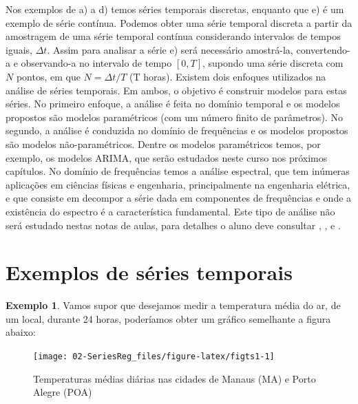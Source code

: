 \documentclass[
]{book}
\theoremstyle{definition}
\theoremstyle{definition}
\newtheorem{example}{Exemplo}[chapter]
\theoremstyle{definition}
\theoremstyle{remark}
\begin{document}
Nos exemplos de a) a d) temos séries temporais discretas, enquanto que e) é um exemplo de série contínua. Podemos obter uma série temporal discreta a partir da amostragem de uma série temporal contínua considerando intervalos de tempos iguais, \(\Delta t\). Assim para analisar a série e) será necessário amostrá-la, convertendo-a e observando-a no intervalo de tempo \([0,T]\), supondo uma série discreta com \(N\) pontos, em que \(N = \Delta t/T\) (T horas). Existem dois enfoques utilizados na análise de séries temporais. Em ambos, o objetivo é construir modelos para estas séries. No primeiro enfoque, a análise é feita no domínio temporal e os modelos propostos são modelos paramétricos (com um número finito de parâmetros). No segundo, a análise é conduzida no domínio de frequências e os modelos propostos são modelos não-paramétricos. Dentre os modelos paramétricos temos, por exemplo, os modelos ARIMA, que serão estudados neste curso nos próximos capítulos. No domínio de frequências temos a análise espectral, que tem inúmeras aplicações em ciências físicas e engenharia, principalmente na engenharia elétrica, e que consiste em decompor a série dada em componentes de frequências e onde a existência do espectro é a característica fundamental. Este tipo de análise não será estudado nestas notas de aulas, para detalhes o aluno deve consultar \citet{watts1968}, \citet{koopmans1974}, \citet{morettin1978} e \citet{marple1980}.

\hypertarget{exemplos-de-suxe9ries-temporais}{%
\section{Exemplos de séries temporais}\label{exemplos-de-suxe9ries-temporais}}

\begin{example}
\protect\hypertarget{exm:exemptemp}{}{\label{exm:exemptemp} }Vamos supor que desejamos medir a temperatura média do ar, de um local,
durante 24 horas, poderíamos obter um gráfico semelhante a figura abaixo:
\end{example}

\begin{figure}

{\centering \texttt{[image: 02-SeriesReg\_files/figure-latex/figts1-1]} 

}

\caption{Temperaturas médias diárias nas cidades de Manaus (MA) e Porto Alegre (POA)}\label{fig:figts1}
\end{figure}
\end{document}
